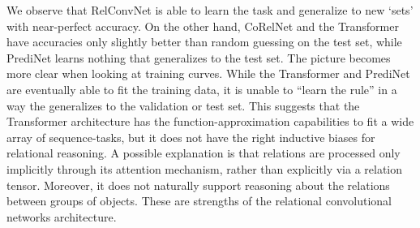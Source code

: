 We observe that RelConvNet is able to learn the task and generalize to new `sets' with near-perfect accuracy. On the other hand, CoRelNet and the Transformer have accuracies only slightly better than random guessing on the test set, while PrediNet learns nothing that generalizes to the test set. The picture becomes more clear when looking at training curves. While the Transformer and PrediNet are eventually able to fit the training data, it is unable to ``learn the rule'' in a way the generalizes to the validation or test set. This suggests that the Transformer architecture has the function-approximation capabilities to fit a wide array of sequence-tasks, but it does not have the right inductive biases for relational reasoning. A possible explanation is that relations are processed only implicitly through its attention mechanism, rather than explicitly via a relation tensor. Moreover, it does not naturally support reasoning about the relations between groups of objects. These are strengths of the relational convolutional networks architecture.